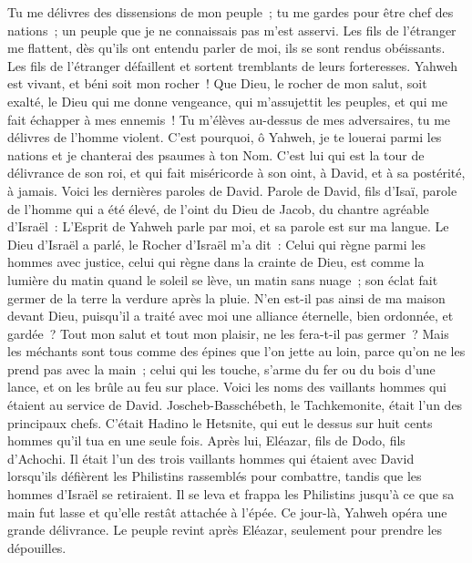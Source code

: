 \begin{multicols}{2}
Tu me délivres des dissensions de mon peuple~; tu me gardes pour être chef des nations~; un peuple que je ne connaissais pas m'est asservi.
Les fils de l'étranger me flattent, dès qu'ils ont entendu parler de moi, ils se sont rendus obéissants.
Les fils de l'étranger défaillent et sortent tremblants de leurs forteresses.
Yahweh est vivant, et béni soit mon rocher~! Que Dieu, le rocher de mon salut, soit exalté,
le Dieu qui me donne vengeance, qui m'assujettit les peuples,
et qui me fait échapper à mes ennemis~! Tu m'élèves au-dessus de mes adversaires, tu me délivres de l'homme violent.
C'est pourquoi, ô Yahweh, je te louerai parmi les nations et je chanterai des psaumes à ton Nom.
C'est lui qui est la tour de délivrance de son roi, et qui fait miséricorde à son oint, à David, et à sa postérité, à jamais.
\VerseOne{}Voici les dernières paroles de David. Parole de David, fils d'Isaï, parole de l'homme qui a été élevé, de l'oint du Dieu de Jacob, du chantre agréable d'Israël~:
L'Esprit de Yahweh parle par moi, et sa parole est sur ma langue.
Le Dieu d'Israël a parlé, le Rocher d'Israël m'a dit~: Celui qui règne parmi les hommes avec justice, celui qui règne dans la crainte de Dieu,
est comme la lumière du matin quand le soleil se lève, un matin sans nuage~; son éclat fait germer de la terre la verdure après la pluie.
N'en est-il pas ainsi de ma maison devant Dieu, puisqu'il a traité avec moi une alliance éternelle, bien ordonnée, et gardée~? Tout mon salut et tout mon plaisir, ne les fera-t-il pas germer~?
Mais les méchants sont tous comme des épines que l'on jette au loin, parce qu'on ne les prend pas avec la main~;
celui qui les touche, s'arme du fer ou du bois d'une lance, et on les brûle au feu sur place.
Voici les noms des vaillants hommes qui étaient au service de David. Joscheb-Basschébeth, le Tachkemonite, était l'un des principaux chefs. C'était Hadino le Hetsnite, qui eut le dessus sur huit cents hommes qu'il tua en une seule fois.
Après lui, Eléazar, fils de Dodo, fils d'Achochi. Il était l'un des trois vaillants hommes qui étaient avec David lorsqu'ils défièrent les Philistins rassemblés pour combattre, tandis que les hommes d'Israël se retiraient.
Il se leva et frappa les Philistins jusqu'à ce que sa main fut lasse et qu'elle restât attachée à l'épée. Ce jour-là, Yahweh opéra une grande délivrance. Le peuple revint après Eléazar, seulement pour prendre les dépouilles.

\end{multicols}
